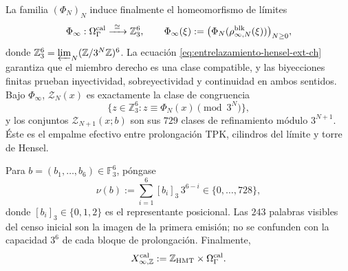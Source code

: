 La familia \((\Phi_N)_N\) induce finalmente el homeomorfismo de límites
\begin{equation}
 \Phi_\infty:\Omega_\Gamma^{\rm cal}
 \xrightarrow{\ \cong\ }\mathbb Z_3^6,\qquad
 \Phi_\infty(\xi):=
 \bigl(\Phi_N(\rho^{\rm blk}_{\infty,N}(\xi))\bigr)_{N\ge0},
 \label{eq:phi-infinito-hensel-ext-ch}
\end{equation}
donde
\(\mathbb Z_3^6=\varprojlim_N(\mathbb Z/3^N\mathbb Z)^6\).
La ecuación \eqref{eq:entrelazamiento-hensel-ext-ch} garantiza que el miembro
derecho es una clase compatible, y las biyecciones finitas prueban
inyectividad, sobreyectividad y continuidad en ambos sentidos. Bajo
\(\Phi_\infty\), \(\mathscr Z_N(x)\) es exactamente la clase de congruencia
\[
 \{z\in\mathbb Z_3^6:z\equiv\Phi_N(x)\pmod{3^N}\},
\]
y los conjuntos \(\mathscr Z_{N+1}(x;b)\) son sus \(729\) clases de refinamiento
módulo \(3^{N+1}\). Éste es el empalme efectivo entre prolongación TPK,
cilindros del límite y torre de Hensel.

Para \(b=(b_1,\ldots,b_6)\in\mathbb F_3^6\), póngase
\[
 \nu(b):=\sum_{i=1}^{6}[b_i]_3\,3^{6-i}
 \in\{0,\ldots,728\},
\tag{C.40c$_0$}
\label{eq:valor-bloque-ch}
\]
donde \([b_i]_3\in\{0,1,2\}\) es el representante posicional. Las
\(243\) palabras visibles del censo inicial son la imagen de la primera
emisión; no se confunden con la capacidad \(3^6\) de cada bloque de
prolongación. Finalmente,
\[
 X_{\infty,\mathbb Z}^{\rm cal}
 :=\mathbb Z_{\rm HMT}\times\Omega_\Gamma^{\rm cal}.
\]

